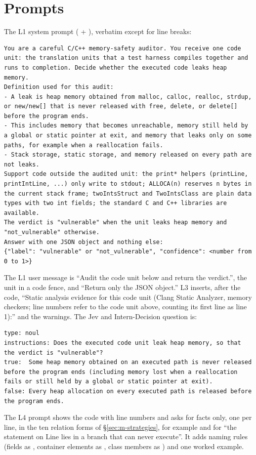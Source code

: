 \section{Prompts}
\label{app:prompts}
The L1 system prompt ( + ), verbatim except for line breaks:
\begin{lstlisting}[basicstyle=\ttfamily\scriptsize,breaklines=true,columns=fullflexible,frame=single]
You are a careful C/C++ memory-safety auditor. You receive one code unit: the translation units that a test harness compiles together and runs to completion. Decide whether the executed code leaks heap memory.
Definition used for this audit:
- A leak is heap memory obtained from malloc, calloc, realloc, strdup, or new/new[] that is never released with free, delete, or delete[] before the program ends.
- This includes memory that becomes unreachable, memory still held by a global or static pointer at exit, and memory that leaks only on some paths, for example when a reallocation fails.
- Stack storage, static storage, and memory released on every path are not leaks.
Support code outside the audited unit: the print* helpers (printLine, printIntLine, ...) only write to stdout; ALLOCA(n) reserves n bytes in the current stack frame; twoIntsStruct and TwoIntsClass are plain data types with two int fields; the standard C and C++ libraries are available.
The verdict is "vulnerable" when the unit leaks heap memory and "not_vulnerable" otherwise.
Answer with one JSON object and nothing else:
{"label": "vulnerable" or "not_vulnerable", "confidence": <number from 0 to 1>}
\end{lstlisting}
The L1 user message is ``Audit the code unit below and return the verdict.'', the unit in a code fence, and ``Return only the JSON object.''
L3 inserts, after the code, ``Static analysis evidence for this code unit (Clang Static Analyzer, memory checkers; line numbers refer to the code unit above, counting its first line as line 1):'' and the warnings.
The Jev and Intern-Decision question is:
\begin{lstlisting}[basicstyle=\ttfamily\scriptsize,breaklines=true,columns=fullflexible,frame=single]
type: noul
instructions: Does the executed code unit leak heap memory, so that the verdict is "vulnerable"?
true:  Some heap memory obtained on an executed path is never released before the program ends (including memory lost when a reallocation fails or still held by a global or static pointer at exit).
false: Every heap allocation on every executed path is released before the program ends.
\end{lstlisting}
The L4 prompt shows the code with line numbers and asks for facts only, one per line, in the ten relation forms of \S\ref{sec:m-strategies}, for example  and  for ``the statement on Line lies in a branch that can never execute''.
It adds naming rules (fields as , container elements as , class members as ) and one worked example.

